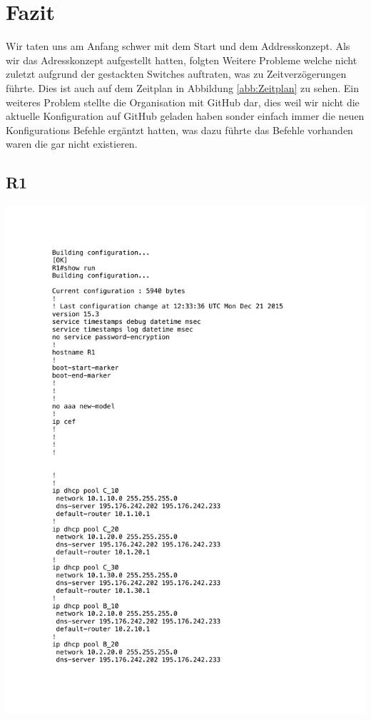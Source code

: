 \documentclass[11pt,a4paper]{scrreprt}
\begin{document}
\newpage
\chapter{Fazit}
Wir taten uns am Anfang schwer mit dem Start und dem Addresskonzept. Als wir das Adresskonzept aufgestellt hatten, folgten Weitere Probleme welche nicht zuletzt aufgrund der gestackten Switches auftraten, was zu Zeitverzögerungen führte. Dies ist auch auf dem Zeitplan in Abbildung \ref{abb:Zeitplan} zu sehen. Ein weiteres Problem stellte die Organisation mit GitHub dar, dies weil wir nicht die aktuelle Konfiguration auf GitHub geladen haben sonder einfach immer die neuen Konfigurations Befehle ergäntzt hatten, was dazu führte das Befehle vorhanden waren die gar nicht existieren.

\appendix
{}

\section{R1}
\vspace{-1cm}
\includegraphics[height=\dimexpr\textheight-4\baselineskip\relax,page=1]{../config_files/R1.pdf}

\end{document}
